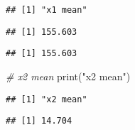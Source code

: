 \documentclass[
]{article}
\newenvironment{Shaded}{\begin{snugshade}}{\end{snugshade}}
\newcommand{\CommentTok}[1]{\textcolor[rgb]{0.56,0.35,0.01}{\textit{#1}}}
\newcommand{\FunctionTok}[1]{\textcolor[rgb]{0.00,0.00,0.00}{#1}}
\newcommand{\NormalTok}[1]{#1}
\newcommand{\SpecialCharTok}[1]{\textcolor[rgb]{0.00,0.00,0.00}{#1}}
\newcommand{\StringTok}[1]{\textcolor[rgb]{0.31,0.60,0.02}{#1}}
\begin{document}
\begin{verbatim}
## [1] "x1 mean"
\end{verbatim}

\begin{Shaded}
\end{Shaded}

\begin{verbatim}
## [1] 155.603
\end{verbatim}

\begin{Shaded}
\end{Shaded}

\begin{verbatim}
## [1] 155.603
\end{verbatim}

\begin{Shaded}
\begin{Highlighting}[]
\CommentTok{\# x2 mean}
\FunctionTok{print}\NormalTok{(}\StringTok{"x2 mean"}\NormalTok{)}
\end{Highlighting}
\end{Shaded}

\begin{verbatim}
## [1] "x2 mean"
\end{verbatim}

\begin{Shaded}
\end{Shaded}

\begin{verbatim}
## [1] 14.704
\end{verbatim}

\begin{Shaded}
\end{Shaded}
\end{document}
